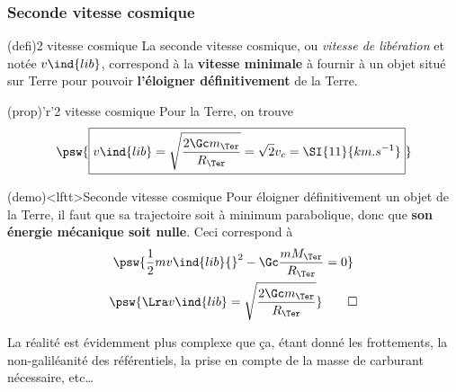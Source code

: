 \documentclass[../../main/main.tex]{subfiles}
\begin{document}
\subsubsection{Seconde vitesse cosmique}
\begin{tcbraster}[raster equal height=rows, raster columns=2]
  \begin{tcb*}(defi){2 vitesse cosmique}
  La seconde vitesse cosmique, ou \textit{vitesse de libération} et notée
  $v\ind{lib}$, correspond à la \textbf{vitesse minimale} à fournir à un objet
  situé sur Terre pour pouvoir \textbf{l'éloigner définitivement} de la Terre.
\end{tcb*}
\begin{tcb*}(prop)'r'{2 vitesse cosmique}
  Pour la Terre, on trouve
  \begin{gather*}
    \psw{
      \boxed{
        v\ind{lib} = \sqrt{\frac{2\Gc m_\Ter}{R_\Ter}} = \sqrt{2}v_c =
        \SI{11}{km.s^{-1}}
      }
    }
  \end{gather*}
\end{tcb*}
\end{tcbraster}
\begin{tcb*}(demo)<lftt>{Seconde vitesse cosmique}
  Pour éloigner définitivement un objet de la Terre, il faut que sa trajectoire
  soit à minimum parabolique, donc que \textbf{son énergie mécanique soit
  nulle}. Ceci correspond à
      \begin{gather*}
        \psw{
          \frac{1}{2}mv\ind{lib}{}^2 -\Gc \frac{mM_\Ter}{R_\Ter} = 0
        }
          \\
        \psw{
          \Lra
          v\ind{lib} = \sqrt{\frac{2\Gc m_\Ter}{R_\Ter}}
        }
      \qed
    \end{gather*}
  \vspace{-15pt}
\end{tcb*}
La réalité est évidemment plus complexe que ça, étant donné les frottements, la
non-galiléanité des référentiels, la prise en compte de la masse de carburant
nécessaire, etc…
\end{document}
